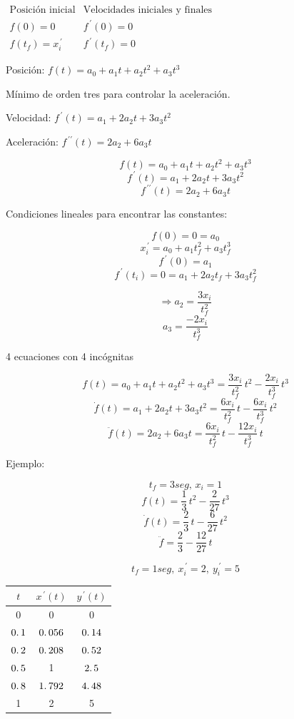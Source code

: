 $
\begin{array}{cc}
	\mbox{Posición inicial} & \mbox{Velocidades iniciales y finales} \\
	f(0) = 0                & f^{\,\prime}(0) = 0 \\
	f(t_{f}) = x_{i}^{\,\prime} & f^{\,\prime} (t_{f}) = 0 
\end{array}
$

Posición: $f(t) = a_{0} + a_{1}t + a_{2}t^{2} + a_{3}t^{3}$

Mínimo de orden tres para controlar la aceleración.

Velocidad: $f^{\,\prime} (t) = a_{1} + 2a_{2}t + 3a_{3}t^2$

Aceleración: $f^{\,\prime\prime} (t) = 2a_{2} + 6a_{3}t$

$$f(t) = a_{0} + a_{1}t + a_{2}t^{2} + a_{3}t^{3}$$
$$f^{\,\prime} (t) = a_{1} + 2a_{2}t + 3a_{3}t^2$$
$$f^{\,\prime\prime} (t) = 2a_{2} + 6a_{3}t$$

Condiciones lineales para encontrar las constantes:

$$f(0) = 0 = a_{0}$$
$$x_{i}^{\,\prime} = a_{0} + a_{1}t_{f}^{2} + a_{3}t_{f}^{3}$$
$$f^{\,\prime}(0) = a_{1}$$
$$f^{\,\prime}(t_{i}) = 0 = a_{1} + 2a_{2}t_{f} + 3a_{3}t_{f}^{2}$$

$$\Rightarrow a_{2} = \dfrac{3x_{i}}{t_{f}^{2}}$$
$$a_{3} = \dfrac{-2x_{i}}{t_{f}^{3}}$$
	
4 ecuaciones con 4 incógnitas

$$f(t) = a_{0} + a_{1}t + a_{2}t^{2} + a_{3}t^{3} = \dfrac{3x_{i}}{t_{f}^{2}}\,t^{2} - \dfrac{2x_{i}}{t_{f}^{3}}\,t^{3}$$
$$\dot{f}(t) = a_{1} + 2a_{2}t + 3a_{3}t^2 = \dfrac{6x_{i}}{t_{f}^2}\,t - \dfrac{6x_{i}}{t_{f}^3}\, t^2$$
$$\ddot{f} (t) = 2a_{2} + 6a_{3}t = \dfrac{6x_{i}}{t_{f}^2}\,t - \dfrac{12x_{i}}{t_{f}^3}\, t$$

Ejemplo:

$$t_{f} = 3 seg,\, x_{i} = 1$$
$$f(t) = \dfrac{1}{3}\,t^2 - \dfrac{2}{27}\,t^3$$
$$\dot{f}(t) = \dfrac{2}{3}\, t - \dfrac{6}{27}\,t^2$$
$$\ddot{f} = \dfrac{2}{3} - \dfrac{12}{27}\, t$$


$$t_{f} = 1seg,\: x_{i}^{\,\prime} = 2,\: y_{i}^{\,\prime} = 5$$


\begin{table}[h!]
	\centering
	\begin{tabular}{c|c|c}
		$t$ & $x^{\,\prime} (t)$ & $y^{\,\prime}(t)$\\\hline
		0 & 0 & 0 \\
		$0\ldotp1$ & $0\ldotp056$ & $0\ldotp14$ \\
		$0\ldotp2$ & $0\ldotp208$ & $0\ldotp52$ \\
		$0\ldotp5$ & 1 & $2\ldotp5$ \\
		$0\ldotp8$ & $1\ldotp792$ & $4\ldotp48$ \\
		1 & 2 & 5
	\end{tabular}
\end{table}


